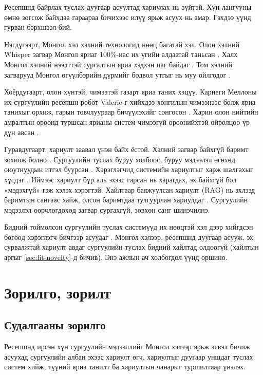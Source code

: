 Ресепшнд байрлах туслах дуугаар асуултад хариулах нь зүйтэй. Хүн лангууны өмнө зогсож байхдаа гараараа бичихээс илүү ярьж асуух нь амар. Гэхдээ үүнд гурван бэрхшээл бий.

Нэгдүгээрт, Монгол хэл хэлний технологид нөөц багатай хэл. Олон хэлний Whisper загвар Монгол яриаг 100\%-иас их үгийн алдаатай таньсан \cite{radford2023whisper}. Халх Монгол хэлний нээлттэй сургалтын яриа хэдхэн цаг байдаг \cite{mengke2025khalkha}. Том хэлний загварууд Монгол өгүүлбэрийн дүрмийг бодвол утгыг нь муу ойлгодог \cite{zhang2024mmeval}.

Хоёрдугаарт, олон хүнтэй, чимээтэй газарт яриа таних хэцүү. Карнеги Меллоны их сургуулийн ресепшн робот Valerie-г хийхдээ хонгилын чимээнээс болж яриа танихыг орхиж, гарын товчлуураар бичүүлэхийг сонгосон \cite{gockley2005valerie}. Харин олон нийтийн амралтын өрөөнд туршсан ярианы систем чимээгүй өрөөнийхтэй ойролцоо үр дүн авсан \cite{pappu2014public}.

Гуравдугаарт, хариулт заавал үнэн байх ёстой. Хэлний загвар байхгүй баримт зохиож болно \cite{lewis2020rag}. Сургуулийн туслах буруу холбоос, буруу мэдээлэл өгөхөд оюутнуудын итгэл буурсан \cite{antico2024unimib}. Хэрэглэгчид системийн хариултыг харж шалгахыг хүсдэг \cite{luger2016badpa}. Иймээс хариулт бүр аль эхээс гарсан нь харагдах, эх байхгүй бол «мэдэхгүй» гэж хэлэх хэрэгтэй. Хайлтаар баяжуулсан хариулт (\ac{RAG}) нь эхлээд баримтын сангаас хайж, олсон баримтдаа тулгуурлан хариулдаг \cite{lewis2020rag}. Сургуулийн мэдээлэл өөрчлөгдөхөд загвар сургахгүй, зөвхөн санг шинэчилнэ.

Бидний тоймолсон сургуулийн туслах системүүд их нөөцтэй хэл дээр хийгдсэн бөгөөд хэрэглэгч бичгээр асуудаг \cite{antico2024unimib,trienes2025marcel,tao2025aloha,matic2026burch,gaglio2019campus}. Монгол хэлээр, ресепшнд дуугаар асууж, эх сурвалжтай хариулт авдаг сургуулийн туслах бидний хайлтад олдоогүй (хайлтын аргыг \ref{sec:lit-novelty}-д бичив). Энэ ажлын ач холбогдол үүнд оршино.

\section{Зорилго, зорилт}
\label{sec:intro-goals}

\subsection{Судалгааны зорилго}

Ресепшнд ирсэн хүн сургуулийн мэдээллийг Монгол хэлээр ярьж эсвэл бичиж асуухад сургуулийн албан эхээс хариулт өгч, хариултыг дуугаар уншдаг туслах систем хийж, түүний яриа танилт ба хариултын чанарыг туршилтаар үнэлэх.

